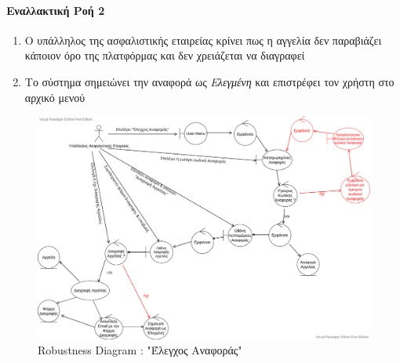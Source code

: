 \documentclass{../ol-softwaremanual}
\begin{document}
	\paragraph{Εναλλακτική Ροή 2}
	\begin{enumerate}
		\item Ο υπάλληλος της ασφαλιστικής εταιρείας κρίνει πως η αγγελία δεν παραβιάζει κάποιον όρο της πλατφόρμας και δεν χρειάζεται να διαγραφεί
		\item Το σύστημα σημειώνει την αναφορά ως \textit{Ελεγμένη}	και επιστρέφει τον χρήστη στο αρχικό μενού
	\end{enumerate}
	
	\begin{figure}[htbp!]
		\includegraphics[scale=0.4]{img/rob_check_report.png}
		\caption{\en Robustness Diagram : "\gr Έλεγχος Αναφοράς\en"\gr}
	\end{figure}
	
	\newpage
	\centering
	
\end{document}

